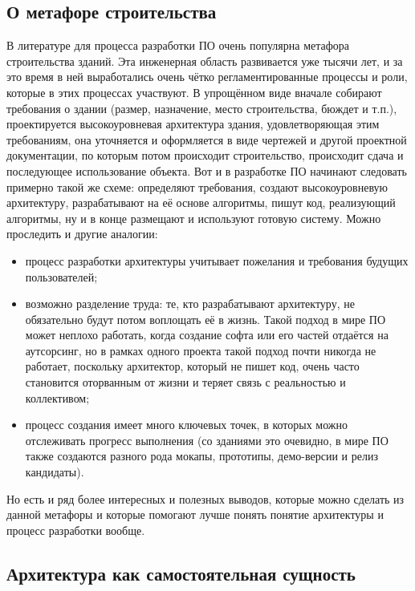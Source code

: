 \documentclass[a5paper]{article}
\begin{document}
\subsection{О метафоре строительства}

В литературе для процесса разработки ПО очень популярна метафора строительства зданий. Эта инженерная область развивается уже тысячи лет, и за это время в ней выработались очень чётко регламентированные процессы и роли, которые в этих процессах участвуют. В упрощённом виде вначале собирают требования о здании (размер, назначение, место строительства, бюждет и т.п.), проектируется высокоуровневая архитектура здания, удовлетворяющая этим требованиям, она уточняется и оформляется в виде чертежей и другой проектной документации, по которым потом происходит строительство, происходит сдача и последующее использование объекта. Вот и в разработке ПО начинают следовать примерно такой же схеме: определяют требования, создают высокоуровневую архитектуру, разрабатывают на её основе алгоритмы, пишут код, реализующий алгоритмы, ну и в конце размещают и используют готовую систему. Можно проследить и другие аналогии:

\begin{itemize}
	\item процесс разработки архитектуры учитывает пожелания и требования будущих пользователей;
	\item возможно разделение труда: те, кто разрабатывают архитектуру, не обязательно будут потом воплощать её в жизнь. Такой подход в мире ПО может неплохо работать, когда создание софта или его частей отдаётся на аутсорсинг, но в рамках одного проекта такой подход почти никогда не работает, поскольку архитектор, который не пишет код, очень часто становится оторванным от жизни и теряет связь с реальностью и коллективом;
	\item процесс создания имеет много ключевых точек, в которых можно отслеживать прогресс выполнения (со зданиями это очевидно, в мире ПО также создаются разного рода мокапы, прототипы, демо-версии и релиз кандидаты).
\end{itemize}

Но есть и ряд более интересных и полезных выводов, которые можно сделать из данной метафоры и которые помогают лучше понять понятие архитектуры и процесс разработки вообще.

\subsection{Архитектура как самостоятельная сущность}
\end{document}
